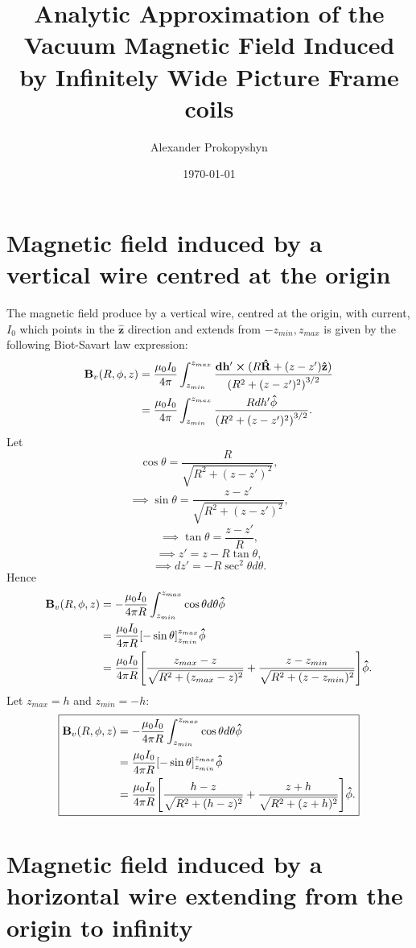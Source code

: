 \documentclass{article}
\title{Analytic Approximation of the Vacuum Magnetic Field Induced by Infinitely Wide Picture Frame coils}
\author{Alexander Prokopyshyn}
\date{\today}
\let\vec\mathbf
\begin{document}
\maketitle

\section{Magnetic field induced by a vertical wire centred at the origin}
\label{sec:vertical_wire_at_origin}

The magnetic field produce by a vertical wire, centred at the origin, with current, \(I_0\) which points in the 
\(\vec{\hat{z}}\) direction and extends from \(-z_{min}, z_{max}\) is given by the following Biot-Savart law expression:
\[\begin{aligned}
    \vec{B}_{v}(R, \phi, z) &= \frac{\mu_0 I_0}{4\pi}\int_{z_{min}}^{z_{max}}\frac{\vec{dh'}\cross(R\vec{\hat{R}} + (z-z')\vec{\hat{z}})}{\qty(R^2+(z-z')^2)^{3/2}} \\
    &= \frac{\mu_0 I_0}{4\pi}\int_{z_{min}}^{z_{max}}\frac{Rdh'\vec{\hat{\phi}}}{\qty(R^2+(z-z')^2)^{3/2}}.
\end{aligned}
\]
Let
\[\cos\theta = \frac{R}{\sqrt{R^2+(z-z')^2}},\]
\[\implies \sin\theta = \frac{z-z'}{\sqrt{R^2+(z-z')^2}},\]
\[\implies \tan \theta = \frac{z-z'}{R},\]
\[\implies z' = z - R\tan\theta,\]
\[\implies dz' = -R\sec^2\theta d\theta.\]
Hence
\[
\begin{aligned}
    \vec{B}_{v}(R, \phi, z) &= -\frac{\mu_0 I_0}{4\pi R}\int_{z_{min}}^{z_{max}}\cos\theta d\theta\vec{\hat{\phi}}\\
    &= \frac{\mu_0 I_0}{4\pi R}\qty[-\sin\theta]_{z_{min}}^{z_{max}}\vec{\hat{\phi}}\\
    &= \frac{\mu_0 I_0}{4\pi R}\qty[\frac{z_{max}-z}{\sqrt{R^2+(z_{max}-z)^2}} + \frac{z-z_{min}}{\sqrt{R^2+(z-z_{min})^2}}]\vec{\hat{\phi}}.
\end{aligned}\]
Let $z_{max}=h$ and $z_{min}=-h$:
\[
\boxed{\begin{aligned}
    \vec{B}_{v}(R, \phi, z) &= -\frac{\mu_0 I_0}{4\pi R}\int_{z_{min}}^{z_{max}}\cos\theta d\theta\vec{\hat{\phi}}\\
    &= \frac{\mu_0 I_0}{4\pi R}\qty[-\sin\theta]_{z_{min}}^{z_{max}}\vec{\hat{\phi}}\\
    &= \frac{\mu_0 I_0}{4\pi R}\qty[\frac{h-z}{\sqrt{R^2+(h-z)^2}} + \frac{z+h}{\sqrt{R^2+(z+h)^2}}]\vec{\hat{\phi}}.
\end{aligned}}\]

\section{Magnetic field induced by a horizontal wire extending from the origin to infinity}
\end{document}
